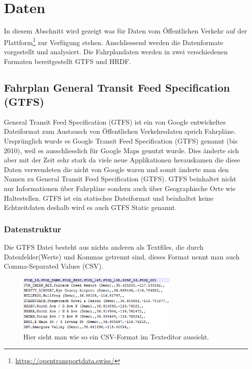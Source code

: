 \section{Daten}
\label{sec:daten}
In diesem Abschnitt wird gezeigt was für Daten vom Öffentlichen Verkehr auf der Plattform\footnote{\url{https://opentransportdata.swiss/}} zur Verfügung stehen. Anschliessend werden die Datenformate vorgestellt und analysiert. Die Fahrplandaten werden in zwei verschiedenen Formaten bereitgestellt GTFS und HRDF. 

\subsection{Fahrplan General Transit Feed Specification (GTFS)}
\label{sec:gtfs-static}
General Transit Feed Specification (GTFS) ist ein von Google entwickeltes Dateiformat zum Austausch von Öffentlichen Verkehrsdaten sprich Fahrpläne. Ursprünglich wurde es Google Transit Feed Specification (GTFS) genannt (bis 2010), weil es ausschliesslich für Google Maps genutzt wurde. Dies änderte sich aber mit der Zeit sehr stark da viele neue Applikationen herauskamen die diese Daten verwendeten die nicht von Google waren und somit änderte man den Namen zu General Transit Feed Specification (GTFS).\cite{gtfsbackground}
\newline
GTFS beinhaltet nicht nur Informationen über Fahrpläne sondern auch über Geographische Orte wie Haltestellen. GTFS ist ein statisches Dateiformat und beinhaltet keine Echtzeitdaten deshalb wird es auch GTFS Static genannt.\cite{gtfs}

\subsubsection{Datenstruktur}
\label{sec:gtfs-datenstruktur}
Die GTFS Datei besteht aus nichts anderen als Textfiles, die durch Datenfelder(Werte) und Kommas getrennt sind, dieses Format nennt man auch Comma-Separated Values (CSV).

\begin{figure}[]
	\centering
	\includegraphics[width=8cm]{img/bspcsv.png}
	\caption{Hier sieht man wie so ein CSV-Format im Texteditor aussieht.}
	\label{fig:gtfs-dateiformat}
\end{figure}

